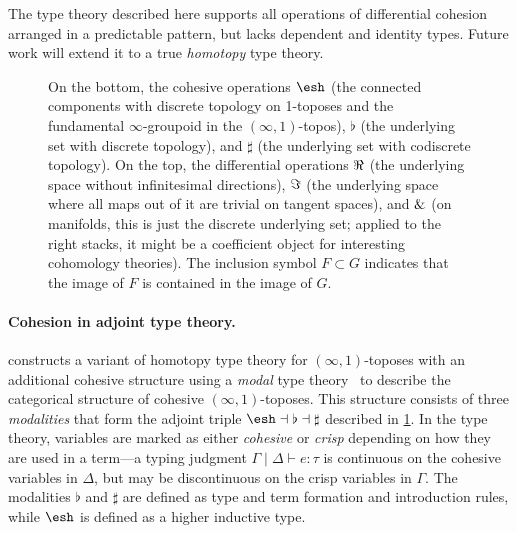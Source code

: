 \documentclass{article}
\begin{document}
The type theory described here supports all operations of differential cohesion
arranged in a predictable pattern, but lacks dependent and identity types.
Future work will extend it to a true \emph{homotopy} type theory.

\begin{figure}
\begin{center}
\end{center}
\caption{On the bottom, the cohesive operations $\shape$ (the connected
  components with discrete topology on 1-toposes and the fundamental
  $\infty$-groupoid in the $(\infty,1)$-topos), $\flat$ (the underlying set with
  discrete topology), and $\sharp$ (the underlying set with codiscrete
  topology). On the top, the differential operations $\Re$ (the underlying
  space without infinitesimal directions), $\Im$ (the underlying space where
  all maps out of it are trivial on tangent spaces), and $\&$ (on manifolds,
  this is just the discrete underlying set; applied to the right stacks, it
  might be a coefficient object for interesting cohomology theories). The
  inclusion symbol $F \subset G$ indicates that the image of $F$ is contained in
  the image of $G$.}
\label{fig:modalities}
\end{figure}


\paragraph{Cohesion in adjoint type theory.}

\citet{Shulman2015} constructs a variant of homotopy type theory for
$(\infty,1)$-toposes with an additional cohesive structure using a \emph{modal}
type theory~\citep{Pfenning2001} to describe the categorical structure of
cohesive $(\infty,1)$-toposes. This structure consists of three
\emph{modalities} that form the adjoint triple
$\shape \dashv \flat \dashv \sharp$ described in
\cref{fig:modalities}. In the type theory, variables are marked as either
\emph{cohesive} or \emph{crisp} depending on how they are used in a term---a
typing judgment $\Gamma \mid \Delta \vdash e : \tau$ is continuous on the
cohesive variables in $\Delta$, but may be discontinuous on the crisp variables
in $\Gamma$. The modalities $\flat$ and $\sharp$ are defined as type and term
formation and introduction rules, while $\shape$ is defined as a higher
inductive type.
\end{document}
